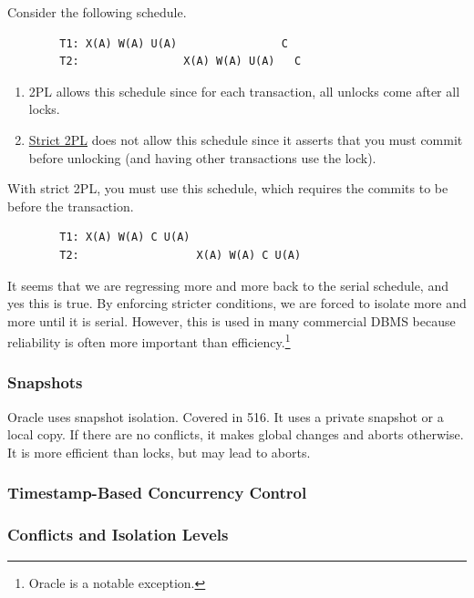     \begin{example}[2PL vs Strict 2PL]
      \label{ex:2pl-vs-strict-2pl}
      Consider the following schedule. 
      \begin{lstlisting}
        T1: X(A) W(A) U(A)                C
        T2:                X(A) W(A) U(A)   C
      \end{lstlisting}
      \begin{enumerate}
        \item 2PL allows this schedule since for each transaction, all unlocks come after all locks. 
        \item \hyperref[def:strict-2pl]{Strict 2PL} does not allow this schedule since it asserts that you must commit before unlocking (and having other transactions use the lock). 
      \end{enumerate} 
      With strict 2PL, you must use this schedule, which requires the commits to be before the transaction. 
      \begin{lstlisting}
        T1: X(A) W(A) C U(A) 
        T2:                  X(A) W(A) C U(A)
      \end{lstlisting}
    \end{example}

    It seems that we are regressing more and more back to the serial schedule, and yes this is true. By enforcing stricter conditions, we are forced to isolate more and more until it is serial. However, this is used in many commercial DBMS because reliability is often more important than efficiency.\footnote{Oracle is a notable exception.} 

  \subsubsection{Snapshots} 
    
    Oracle uses snapshot isolation. Covered in 516. It uses a private snapshot or a local copy. If there are no conflicts, it makes global changes and aborts otherwise. It is more efficient than locks, but may lead to aborts.  

  \subsubsection{Timestamp-Based Concurrency Control} 
    
    

  \subsubsection{Conflicts and Isolation Levels}

